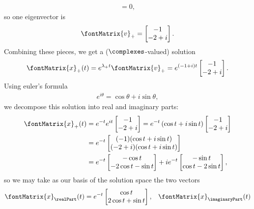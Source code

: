{\begin{align*}
=
0,
\end{align*}
so one eigenvector is
\begin{align*}
\fontMatrix{v}_{+}
=
\begin{bmatrix}%
-1	\\
-2 + i
\end{bmatrix}%
.
\end{align*}
Combining these pieces, we get a ($\complexes$-valued) solution
\begin{align*}
\fontMatrix{x}_{+}(t)
=
e^{\lambda_{+} t} \fontMatrix{v}_{+}
=
e^{(-1 + i) t}
\begin{bmatrix}%
-1	\\
-2 + i
\end{bmatrix}%
.
\end{align*}
Using euler's formula
\begin{align*}
e^{i \theta}
=
\cos \theta + i \sin \theta,
\end{align*}
we decompose this solution into real and imaginary parts:
\begin{align*}
\fontMatrix{x}_{+}(t)
&=
e^{-t} e^{i t}
\begin{bmatrix}%
-1	\\
-2 + i
\end{bmatrix}%
=
e^{-t} \left(\cos t + i \sin t\right)
\begin{bmatrix}%
-1	\\
-2 + i
\end{bmatrix}%
\\
&=
e^{-t}
\begin{bmatrix}%
(-1) (\cos t + i \sin t)		\\
(-2 + i) (\cos t + i \sin t)
\end{bmatrix}%
\\
&=
e^{-t}
\begin{bmatrix}%
-\cos t	\\
-2 \cos t - \sin t
\end{bmatrix}%
+ i 
e^{-t}
\begin{bmatrix}%
-\sin t		\\
\cos t - 2 \sin t
\end{bmatrix}%
,
\end{align*}
so we may take as our basis of the solution space the two vectors
\begin{align*}
\fontMatrix{x}_{\realPart}(t)
=
e^{-t}
\begin{bmatrix}%
\cos t	\\
2 \cos t + \sin t
\end{bmatrix}%
,
&&
\fontMatrix{x}_{\imaginaryPart}(t)

\end{align*}}
